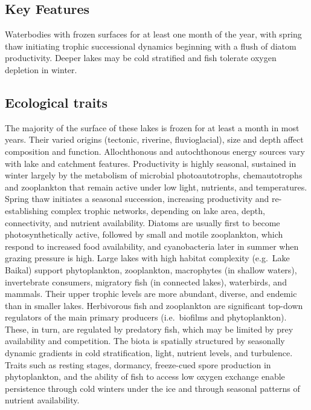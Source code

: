 \documentclass[
  letterpaper,
  DIV=11,
  numbers=noendperiod]{scrartcl}
\begin{document}
\subsection{Key Features}\label{key-features-120}

Waterbodies with frozen surfaces for at least one month of the year,
with spring thaw initiating trophic successional dynamics beginning with
a flush of diatom productivity. Deeper lakes may be cold stratified and
fish tolerate oxygen depletion in winter.

\subsection{Ecological traits}\label{ecological-traits-120}

The majority of the surface of these lakes is frozen for at least a
month in most years. Their varied origins (tectonic, riverine,
fluvioglacial), size and depth affect composition and function.
Allochthonous and autochthonous energy sources vary with lake and
catchment features. Productivity is highly seasonal, sustained in winter
largely by the metabolism of microbial photoautotrophs, chemautotrophs
and zooplankton that remain active under low light, nutrients, and
temperatures. Spring thaw initiates a seasonal succession, increasing
productivity and re-establishing complex trophic networks, depending on
lake area, depth, connectivity, and nutrient availability. Diatoms are
usually first to become photosynthetically active, followed by small and
motile zooplankton, which respond to increased food availability, and
cyanobacteria later in summer when grazing pressure is high. Large lakes
with high habitat complexity (e.g.~Lake Baikal) support phytoplankton,
zooplankton, macrophytes (in shallow waters), invertebrate consumers,
migratory fish (in connected lakes), waterbirds, and mammals. Their
upper trophic levels are more abundant, diverse, and endemic than in
smaller lakes. Herbivorous fish and zooplankton are significant top-down
regulators of the main primary producers (i.e.~biofilms and
phytoplankton). These, in turn, are regulated by predatory fish, which
may be limited by prey availability and competition. The biota is
spatially structured by seasonally dynamic gradients in cold
stratification, light, nutrient levels, and turbulence. Traits such as
resting stages, dormancy, freeze-cued spore production in phytoplankton,
and the ability of fish to access low oxygen exchange enable persistence
through cold winters under the ice and through seasonal patterns of
nutrient availability.
\end{document}
